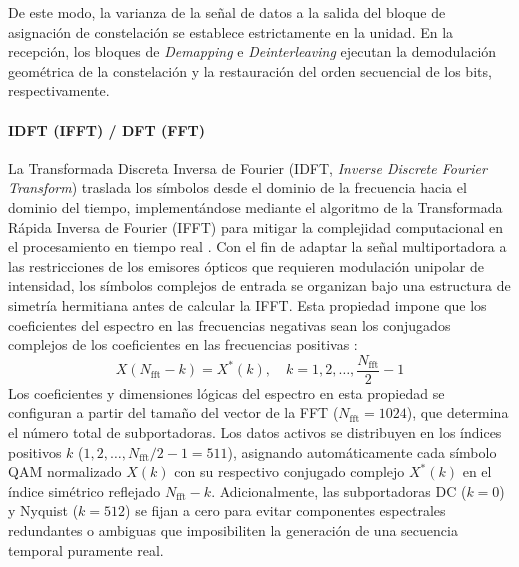De este modo, la varianza de la señal de datos a la salida del bloque de asignación de constelación se establece estrictamente en la unidad. En la recepción, los bloques de \textit{Demapping} e \textit{Deinterleaving} ejecutan la demodulación geométrica de la constelación y la restauración del orden secuencial de los bits, respectivamente.

\paragraph{IDFT (IFFT) / DFT (FFT)}
La Transformada Discreta Inversa de Fourier (IDFT, \textit{Inverse Discrete Fourier Transform}) traslada los símbolos desde el dominio de la frecuencia hacia el dominio del tiempo, implementándose mediante el algoritmo de la Transformada Rápida Inversa de Fourier (IFFT) para mitigar la complejidad computacional en el procesamiento en tiempo real \cite{solaija2023light}. Con el fin de adaptar la señal multiportadora a las restricciones de los emisores ópticos que requieren modulación unipolar de intensidad, los símbolos complejos de entrada se organizan bajo una estructura de simetría hermitiana antes de calcular la IFFT. Esta propiedad impone que los coeficientes del espectro en las frecuencias negativas sean los conjugados complejos de los coeficientes en las frecuencias positivas \cite{islim2017modulation}:
\begin{equation}
X(N_{\text{fft}} - k) = X^*(k), \quad k = 1, 2, \dots, \frac{N_{\text{fft}}}{2} - 1
\label{eq:simetria_hermitiana_theory}
\end{equation}
Los coeficientes y dimensiones lógicas del espectro en esta propiedad se configuran a partir del tamaño del vector de la FFT ($N_{\text{fft}} = 1024$), que determina el número total de subportadoras. Los datos activos se distribuyen en los índices positivos $k$ ($1, 2, \dots, N_{\text{fft}}/2 - 1 = 511$), asignando automáticamente cada símbolo QAM normalizado $X(k)$ con su respectivo conjugado complejo $X^*(k)$ en el índice simétrico reflejado $N_{\text{fft}}-k$. Adicionalmente, las subportadoras DC ($k=0$) y Nyquist ($k=512$) se fijan a cero para evitar componentes espectrales redundantes o ambiguas que imposibiliten la generación de una secuencia temporal puramente real.

